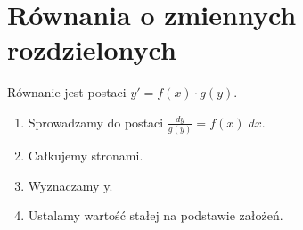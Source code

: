\section{Równania o zmiennych rozdzielonych}
Równanie jest postaci \( y' = f(x) \cdot g(y) \).
\begin{enumerate}
	\singlespacing
	\item Sprowadzamy do postaci \( \frac{dy}{g(y)}=f(x)\;dx \).
	\item Całkujemy stronami.
	\item Wyznaczamy y.
	\item Ustalamy wartość stałej na podstawie założeń.
\end{enumerate}